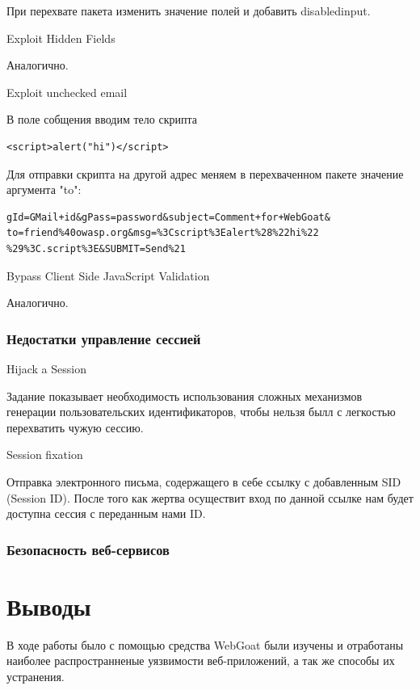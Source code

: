 \documentclass[10pt,a4paper]{article}
\begin{document}
При перехвате пакета изменить значение полей и добавить disabledinput.

Exploit Hidden Fields 

Аналогично.

Exploit unchecked email

В поле собщения вводим тело скрипта
\begin{verbatim}
<script>alert("hi")</script>
\end{verbatim}
Для отправки скрипта на другой адрес меняем в перехваченном пакете значение аргумента "to":
\begin{verbatim}
gId=GMail+id&gPass=password&subject=Comment+for+WebGoat&
to=friend%40owasp.org&msg=%3Cscript%3Ealert%28%22hi%22
%29%3C.script%3E&SUBMIT=Send%21
\end{verbatim}

Bypass Client Side JavaScript Validation 

Аналогично.

\subsubsection{Недостатки управление сессией}

Hijack a Session 

Задание показывает необходимость использования сложных механизмов генерации пользовательских идентификаторов, чтобы нельзя былл с легкостью перехватить чужую сессию.

Session fixation 

Отправка электронного письма, содержащего в себе ссылку с добавленным SID (Session ID). После того как жертва осуществит вход по данной ссылке нам будет доступна сессия с переданным нами ID.

\subsubsection{Безопасность веб-сервисов}

\newpage

\section{Выводы}
В ходе работы было с помощью средства WebGoat были изучены и отработаны наиболее распространненые уязвимости веб-приложений, а так же способы их устранения.
\end{document}
